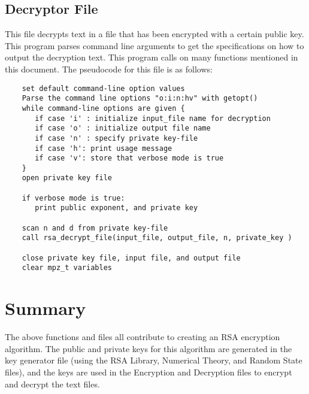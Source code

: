 \documentclass[11pt]{article}
\begin{document}
\subsection{Decryptor File}
This file decrypts text in a file that has been encrypted with a certain public key. This program parses command line arguments to get the specifications on how to output the decryption text. This program calls on many functions mentioned in this document. The pseudocode for this file is as follows:
\begin{verbatim}
    set default command-line option values
    Parse the command line options "o:i:n:hv" with getopt()
    while command-line options are given {
       if case 'i' : initialize input_file name for decryption
       if case 'o' : initialize output file name
       if case 'n' : specify private key-file
       if case 'h': print usage message
       if case 'v': store that verbose mode is true
    }
    open private key file

    if verbose mode is true:
       print public exponent, and private key

    scan n and d from private key-file
    call rsa_decrypt_file(input_file, output_file, n, private_key )

    close private key file, input file, and output file
    clear mpz_t variables

\end{verbatim}

\section{Summary}
The above functions and files all contribute to creating an RSA encryption algorithm. The public and private keys for this algorithm are generated in the key generator file (using the RSA Library, Numerical Theory, and Random State files), and the keys are used in the Encryption and Decryption files to encrypt and decrypt the text files.
\end{document}
